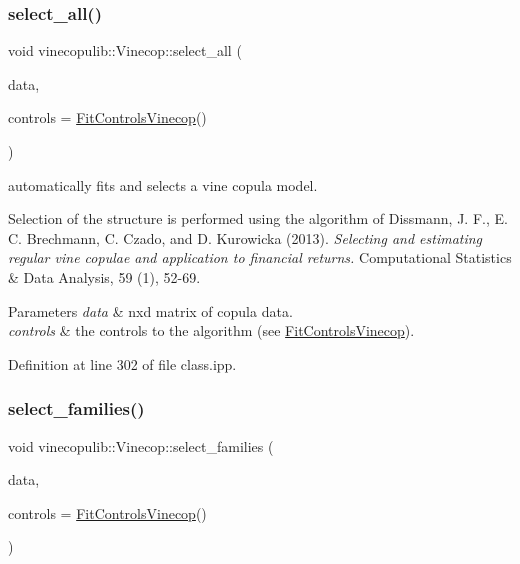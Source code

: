 \subsubsection{\texorpdfstring{select\+\_\+all()}{select\_all()}}
{\footnotesize\ttfamily void vinecopulib\+::\+Vinecop\+::select\+\_\+all (\begin{DoxyParamCaption}\item[{const Eigen\+::\+Matrix\+Xd \&}]{data,  }\item[{const \hyperlink{classvinecopulib_1_1_fit_controls_vinecop}{Fit\+Controls\+Vinecop} \&}]{controls = {\ttfamily \hyperlink{classvinecopulib_1_1_fit_controls_vinecop}{Fit\+Controls\+Vinecop}()} }\end{DoxyParamCaption})\hspace{0.3cm}{\ttfamily [inline]}}



automatically fits and selects a vine copula model. 

Selection of the structure is performed using the algorithm of Dissmann, J. F., E. C. Brechmann, C. Czado, and D. Kurowicka (2013). {\itshape Selecting and estimating regular vine copulae and application to financial returns.} Computational Statistics \& Data Analysis, 59 (1), 52-\/69.


\begin{DoxyParams}{Parameters}
{\em data} & nxd matrix of copula data. \\
\hline
{\em controls} & the controls to the algorithm (see \hyperlink{classvinecopulib_1_1_fit_controls_vinecop}{Fit\+Controls\+Vinecop}). \\
\hline
\end{DoxyParams}


Definition at line 302 of file class.\+ipp.

\mbox{\label{classvinecopulib_1_1_vinecop_a5e6cacd0883811fcd80c772ace747c43}} 
\subsubsection{\texorpdfstring{select\+\_\+families()}{select\_families()}}
{\footnotesize\ttfamily void vinecopulib\+::\+Vinecop\+::select\+\_\+families (\begin{DoxyParamCaption}\item[{const Eigen\+::\+Matrix\+Xd \&}]{data,  }\item[{const \hyperlink{classvinecopulib_1_1_fit_controls_vinecop}{Fit\+Controls\+Vinecop} \&}]{controls = {\ttfamily \hyperlink{classvinecopulib_1_1_fit_controls_vinecop}{Fit\+Controls\+Vinecop}()} }\end{DoxyParamCaption})\hspace{0.3cm}{\ttfamily [inline]}}



